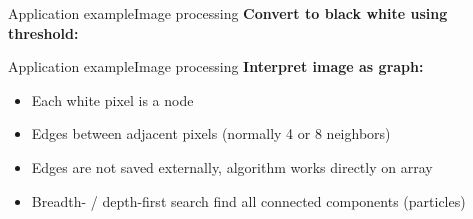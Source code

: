 \begin{frame}{Application example}{Image processing}
  \textbf{Convert to black white using threshold:}\\
  \begin{center}
    \begin{adjustbox}{width=0.8\linewidth}
      
    \end{adjustbox}
  \end{center}
\end{frame}


\begin{frame}{Application example}{Image processing}
  \textbf{Interpret image as graph:}
  \begin{itemize}
    \item
      Each white pixel is a node
    \item
      Edges between adjacent pixels (normally 4 or 8 neighbors)
    \item
      Edges are not saved externally,
      algorithm works directly on array
    \item
      Breadth- / depth-first search find all connected components (particles)
  \end{itemize}
\end{frame}


